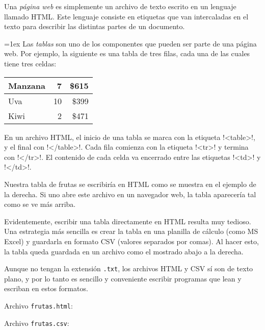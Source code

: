 Una \emph{página web}
es simplemente un archivo de texto
escrito en un lenguaje llamado HTML\@.
Este lenguaje consiste en etiquetas
que van intercaladas en el texto
para describir las distintas partes de un documento.

\newcommand\lh{\li[language=html]}

\begin{minipage}[t]{0.7\textwidth}
  \parskip=1ex
  Las \emph{tablas} son uno de los componentes
  que pueden ser parte de una página web.
  Por ejemplo,
  la siguiente es una tabla de tres filas,
  cada una de las cuales tiene tres celdas:

  \vspace{1ex}
  \hfil
  \begin{tabular}{|l|r|r|}  \hline
    Manzana &  7 & \$615 \\ \hline
    Uva     & 10 & \$399 \\ \hline
    Kiwi    &  2 & \$471 \\ \hline
  \end{tabular}
  \vspace{1ex}
  \hfill

  En un archivo HTML,
  el inicio de una tabla se marca con la etiqueta \lh!<table>!,
  y el final con \lh!</table>!.
  Cada fila comienza con la etiqueta \lh!<tr>!
  y termina con \lh!</tr>!.
  El contenido de cada celda va encerrado entre las etiquetas
  \lh!<td>! y \lh!</td>!.

  Nuestra tabla de frutas se escribiría en HTML
  como se muestra en el ejemplo de la derecha.
  Si uno abre este archivo en un navegador web,
  la tabla aparecería tal como se ve más arriba.

  Evidentemente,
  escribir una tabla directamente en HTML resulta muy tedioso.
  Una estrategia más sencilla es crear la tabla en una planilla de cálculo
  (como MS Excel)
  y guardarla en formato CSV (valores separados por comas).
  Al hacer esto,
  la tabla queda guardada en un archivo como el mostrado abajo a la derecha.

  Aunque no tengan la extensión \verb!.txt!,
  los archivos HTML y CSV sí son de texto plano,
  y por lo tanto es sencillo y conveniente escribir programas
  que lean y escriban en estos formatos.
\end{minipage}
\hfill
\begin{minipage}[t]{0.25\textwidth}
  Archivo \verb+frutas.html+:
  

  Archivo \verb+frutas.csv+:
  
\end{minipage}

